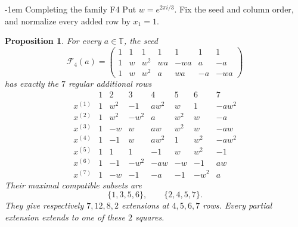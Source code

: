 \documentclass[11pt,a4paper]{article}
\makeatletter
\newtheorem{proposition}[theorem]{Proposition}
\theoremstyle{plain}
\theoremstyle{definition}
\numberwithin{equation}{section}
\renewcommand\subsection{\@startsection{subsection}{2}{\z@}  {\medskipamount}  {-1em}  {\normalfont\normalsize\bfseries}}
\makeatother
\begin{document}
\subsection{Completing the family F4}\label{sec:f4}\label{pilot:square}
Put $w=e^{2\pi i/3}$. Fix the seed and column order, and normalize every added row by $x_1=1$.
\begin{proposition}\label{pilot:rows}\label{pilot:completion}
For every $a\in\mathbb T$, the seed
$$
\mathcal F_4(a)=\begin{pmatrix}
1&1&1&1&1&1&1\\
1&w&w^2&wa&-wa&a&-a\\
1&w&w^2&a&wa&-a&-wa
\end{pmatrix}
$$
has exactly the $7$ regular additional rows
$$
\begin{array}{c|rrrrrrr}
 &1&2&3&4&5&6&7\\\hline
x^{(1)}&1&w^2&-1&aw^2&w&1&-aw^2\\
x^{(2)}&1&w^2&-w^2&a&w^2&w&-a\\
x^{(3)}&1&-w&w&aw&w^2&w&-aw\\
x^{(4)}&1&-1&w&aw^2&1&w^2&-aw^2\\
x^{(5)}&1&1&1&-1&w&w^2&-1\\
x^{(6)}&1&-1&-w^2&-aw&-w&-1&aw\\
x^{(7)}&1&-w&-1&-a&-1&-w^2&a
\end{array}
$$
Their maximal compatible subsets are
$$\boxed{\quad\{1,3,5,6\},\qquad \{2,4,5,7\}.\quad}$$
They give respectively $7,12,8,2$ extensions at $4,5,6,7$ rows. Every partial extension extends to one of these $2$ squares.
\end{proposition}
\end{document}
